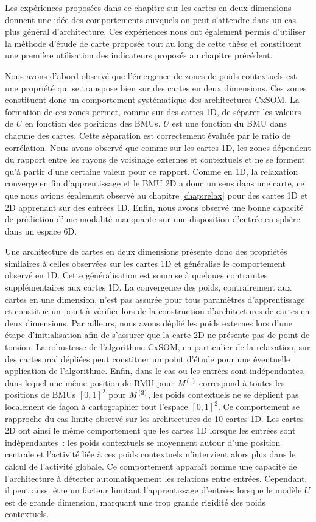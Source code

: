 \documentclass[../main]{subfiles}
\begin{document}
Les expériences proposées dans ce chapitre sur les cartes en deux dimensions donnent une idée des comportements auxquels on peut s'attendre dans un cas plus général d'architecture.
Ces expériences nous ont également permis d'utiliser la méthode d'étude de carte proposée tout au long de cette thèse et constituent une première utilisation des indicateurs proposés au chapitre précédent.


Nous avons d'abord observé que l'émergence de zones de poids contextuels est une propriété qui se transpose bien sur des cartes en deux dimensions. Ces zones constituent donc un comportement systématique des architectures CxSOM.
La formation de ces zones permet, comme sur des cartes 1D, de séparer les valeurs de $U$ en fonction des positions des BMUs. $U$ est une fonction du BMU dans chacune des cartes.
Cette séparation est correctement évaluée par le ratio de corrélation.
Nous avons observé que comme sur les cartes 1D, les zones dépendent du rapport entre les rayons de voisinage externes et contextuels et ne se forment qu'à partir d'une certaine valeur pour ce rapport.
Comme en 1D, la relaxation converge en fin d'apprentissage et le BMU 2D a donc un sens dans une carte, ce que nous avions également observé au chapitre \ref{chap:relax} pour des cartes 1D et 2D apprenant sur des entrées 1D.
Enfin, nous avons observé une bonne capacité de prédiction d'une modalité manquante sur une disposition d'entrée en sphère dans un espace 6D.

Une architecture de cartes en deux dimensions présente donc des propriétés similaires à celles observées sur les cartes 1D et généralise le comportement observé en 1D.
Cette généralisation est soumise à quelques contraintes supplémentaires aux cartes 1D.
La convergence des poids, contrairement aux cartes en une dimension, n'est pas assurée pour tous paramètres d'apprentissage et constitue un point à vérifier lors de la construction d'architectures de cartes en deux dimensions.
Par ailleurs, nous avons déplié les poids externes lors d'une étape d'initialisation afin de s'assurer que la carte 2D ne présente pas de point de torsion. La robustesse de l'algorithme CxSOM, en particulier de la relaxation, sur des cartes \og mal dépliées \fg{} peut constituer un point d'étude pour une éventuelle application de l'algorithme.
Enfin, dans le cas ou les entrées sont indépendantes, dans lequel une même position de BMU pour $M^{({1})}$ correspond à toutes les positions de BMUs $[0,1]^2$ pour $M^{({2})}$, les poids contextuels ne se déplient pas localement de façon à cartographier tout l'espace $[0,1]^2$.
Ce comportement se rapproche du cas limite observé sur les architectures de 10 cartes 1D. 
Les cartes 2D ont ainsi le même comportement que les cartes 1D lorsque les entrées sont indépendantes~: les poids contextuels se moyennent autour d'une position centrale et l'activité liée à ces poids contextuels n'intervient alors plus dans le calcul de l'activité globale.
Ce comportement apparaît comme une capacité de l'architecture à détecter automatiquement les relations entre entrées. Cependant, il peut aussi être un facteur limitant l'apprentissage d'entrées lorsque le modèle $U$ est de grande dimension, marquant une trop grande rigidité des poids contextuels. 
\end{document}
